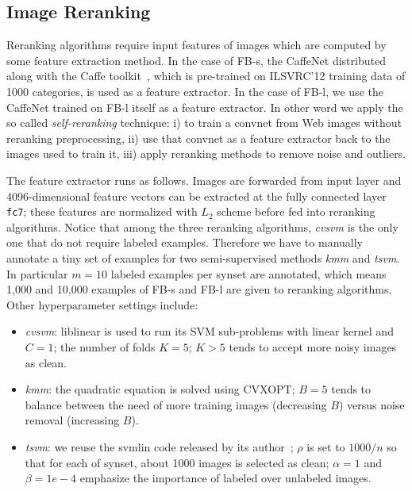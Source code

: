 \documentclass[preprint,12pt]{elsarticle}
\begin{document}
\subsection{Image Reranking}\label{sec:reranksetting}
\noindent Reranking algorithms require input features of images which are computed by some feature extraction method. In the case of FB-s, the CaffeNet distributed along with the Caffe toolkit~\cite{jia2014caffe}, which is pre-trained on ILSVRC'12 training data of 1000 categories, is used as a feature extractor. In the case of FB-l, we use the CaffeNet trained on FB-l itself as a feature extractor. In other word we apply the so called \emph{self-reranking} technique:  i) to train a convnet from Web images without reranking preprocessing, ii) use that convnet as a feature extractor back to the images used to train it, iii) apply reranking methods to remove noise and outliers. 

The feature extractor runs as follows. Images are forwarded from input layer and  4096-dimensional feature vectors can be extracted at the fully connected layer \texttt{fc7}; these features are normalized with $L_2$ scheme before fed into reranking algorithms. Notice that among the three reranking algorithms, \emph{cvsvm} is the only one that do not require labeled examples. Therefore we have to manually annotate a tiny set of examples for two semi-supervised methods \emph{kmm} and \emph{tsvm}. In particular $m=10$ labeled examples per synset are annotated, which means 1,000 and 10,000 examples of FB-s and FB-l are given to reranking algorithms. Other hyperparameter settings include:
\begin{itemize}
\item \emph{cvsvm}: liblinear is used to run its SVM sub-problems with linear kernel and $C=1$; the number of folds $K=5$; $K>5$ tends to accept more noisy images as clean.
\item \emph{kmm}: the quadratic equation is solved using CVXOPT; $B=5$ tends to balance between the need of more training images (decreasing $B$) versus noise removal (increasing $B$).
\item \emph{tsvm}: we reuse the svmlin code released by its author~\cite{DBLP:conf/sigir/SindhwaniK06}; $\rho$ is set to $1000/n$ so that for each of synset, about 1000 images is selected as clean; $\alpha=1$ and $\beta=1e-4$ emphasize the importance of labeled over unlabeled images. 
\end{itemize}
\end{document}
